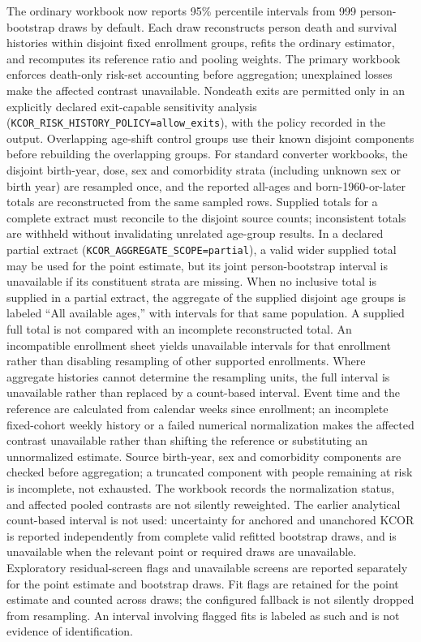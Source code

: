 \documentclass[
]{article}
\begin{document}
The ordinary workbook now reports 95\% percentile intervals from 999 person-bootstrap draws by default. Each draw reconstructs person death and survival histories within disjoint fixed enrollment groups, refits the ordinary estimator, and recomputes its reference ratio and pooling weights. The primary workbook enforces death-only risk-set accounting before aggregation; unexplained losses make the affected contrast unavailable. Nondeath exits are permitted only in an explicitly declared exit-capable sensitivity analysis (\texttt{KCOR\_RISK\_HISTORY\_POLICY=allow\_exits}), with the policy recorded in the output. Overlapping age-shift control groups use their known disjoint components before rebuilding the overlapping groups. For standard converter workbooks, the disjoint birth-year, dose, sex and comorbidity strata (including unknown sex or birth year) are resampled once, and the reported all-ages and born-1960-or-later totals are reconstructed from the same sampled rows. Supplied totals for a complete extract must reconcile to the disjoint source counts; inconsistent totals are withheld without invalidating unrelated age-group results. In a declared partial extract (\texttt{KCOR\_AGGREGATE\_SCOPE=partial}), a valid wider supplied total may be used for the point estimate, but its joint person-bootstrap interval is unavailable if its constituent strata are missing. When no inclusive total is supplied in a partial extract, the aggregate of the supplied disjoint age groups is labeled ``All available ages,'' with intervals for that same population. A supplied full total is not compared with an incomplete reconstructed total. An incompatible enrollment sheet yields unavailable intervals for that enrollment rather than disabling resampling of other supported enrollments. Where aggregate histories cannot determine the resampling units, the full interval is unavailable rather than replaced by a count-based interval. Event time and the reference are calculated from calendar weeks since enrollment; an incomplete fixed-cohort weekly history or a failed numerical normalization makes the affected contrast unavailable rather than shifting the reference or substituting an unnormalized estimate. Source birth-year, sex and comorbidity components are checked before aggregation; a truncated component with people remaining at risk is incomplete, not exhausted. The workbook records the normalization status, and affected pooled contrasts are not silently reweighted. The earlier analytical count-based interval is not used: uncertainty for anchored and unanchored KCOR is reported independently from complete valid refitted bootstrap draws, and is unavailable when the relevant point or required draws are unavailable. Exploratory residual-screen flags and unavailable screens are reported separately for the point estimate and bootstrap draws. Fit flags are retained for the point estimate and counted across draws; the configured fallback is not silently dropped from resampling. An interval involving flagged fits is labeled as such and is not evidence of identification.
\end{document}
